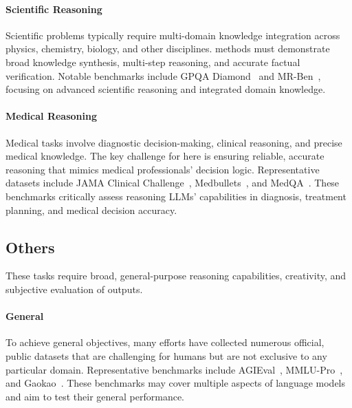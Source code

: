 
\paragraph{Scientific Reasoning}
Scientific problems typically require multi-domain knowledge integration across physics, chemistry, biology, and other disciplines. \TTS methods must demonstrate broad knowledge synthesis, multi-step reasoning, and accurate factual verification. Notable benchmarks include GPQA Diamond~\citep{rein2024gpqa} and MR-Ben~\citep{zeng2024mrben}, focusing on advanced scientific reasoning and integrated domain knowledge.


\paragraph{Medical Reasoning}
Medical tasks involve diagnostic decision-making, clinical reasoning, and precise medical knowledge. The key challenge for \TTS here is ensuring reliable, accurate reasoning that mimics medical professionals’ decision logic. Representative datasets include JAMA Clinical Challenge~\citep{chen2025benchmarkinglargelanguagemodels}, Medbullets~\citep{chen2025benchmarkinglargelanguagemodels}, and MedQA~\citep{jin2020diseasedoespatienthave}. These benchmarks critically assess reasoning LLMs’ capabilities in diagnosis, treatment planning, and medical decision accuracy.



\subsection{Others}
\label{sec:generalpurpose}
These tasks require broad, general-purpose reasoning capabilities, creativity, and subjective evaluation of outputs. 

\paragraph{General}
To achieve general objectives, many efforts have collected numerous official, public datasets that are challenging for humans but are not exclusive to any particular domain. Representative benchmarks include AGIEval~\citep{zhong2024agieval}, MMLU-Pro~\citep{wang2024measuring}, and Gaokao~\citep{guan2025rstarmath}. These benchmarks may cover multiple aspects of language models and aim to test their general performance.

